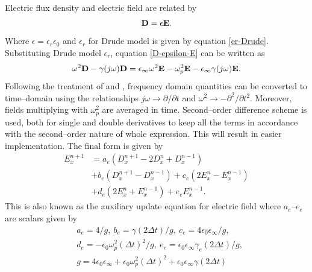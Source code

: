\documentclass{article}
\begin{document}
Electric flux density and electric field are related by
\begin{equation}
\centering
\textbf{D} = \epsilon \textbf{E}.
\label{D-epsilon-E}
\end{equation}
Where $\epsilon = \epsilon_r\epsilon_0$ and $\epsilon_r$ for Drude model is given by equation \ref{er-Drude}. Substituting Drude model $\epsilon_r$, equation \ref{D-epsilon-E} can be written as
\begin{equation}
\centering
\omega^2\textbf{D}-\gamma(j\omega)\textbf{D} = \epsilon_\infty\omega^2\textbf{E}-\omega^2_p\textbf{E}-\epsilon_\infty \gamma(j\omega)\textbf{E}.
\label{D-epsilonomega-E-frequency-domain}
\end{equation}
Following the treatment of \cite{Radial-Zhao} and \cite{JBSchneiderUFDTD}, frequency domain quantities can be converted to time--domain using the relationships $j\omega \rightarrow \partial/\partial t$ and $\omega^2 \rightarrow - \partial^2/\partial t^2$. Moreover, fields multiplying with $\omega^2_p$ are averaged in time. Second--order difference scheme is used, both for single and double derivatives to keep all the terms in accordance with the second--order nature of whole expression. This will result in easier implementation. The final form is given by
\begin{equation}
\begin{split}
E^{n+1}_x&=a_e\left(D^{n+1}_x-2D^n_x+D^{n-1}_x\right)\\&+b_e\left(D^{n+1}_x-D^{n-1}_x\right)
+c_e\left(2E^n_x-E^{n-1}_x\right)\\&+d_e\left(2E^n_x+E^{n-1}_x\right)+e_e E^{n-1}_x.
\end{split}
\label{2nd-order-D-E-final-form}
\end{equation}
This is also known as the auxiliary update equation for electric field where $a_e$--$e_e$ are scalars given by
\begin{equation}
\begin{split}
\nonumber & a_e=4/g,~b_e=\gamma\left(2\Delta t\right)/g,~c_e=4\epsilon_0\epsilon_\infty/g,\\
\nonumber & d_e=-\epsilon_0\omega^2_{p}\left(\Delta t\right)^2/g,~e_e=\epsilon_0\epsilon_\infty \gamma_e\left(2\Delta t\right)/g,\\
\nonumber & g=4\epsilon_0\epsilon_\infty+\epsilon_0\omega^2_{p}\left(\Delta t\right)^2+\epsilon_0\epsilon_\infty \gamma \left(2\Delta t\right)
\end{split}
\label{1D-Drude-E-scalars}
\end{equation}
\end{document}
